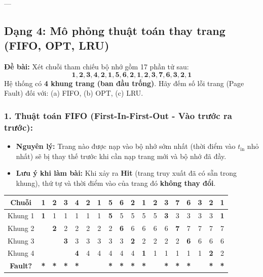 \documentclass[11pt,a4paper]{article}
\begin{document}
---

\subsection{Dạng 4: Mô phỏng thuật toán thay trang (FIFO, OPT, LRU)}

\begin{examplebox}
\textbf{Đề bài:} Xét chuỗi tham chiếu bộ nhớ gồm 17 phần tử sau:
$$\mathbf{1, 2, 3, 4, 2, 1, 5, 6, 2, 1, 2, 3, 7, 6, 3, 2, 1}$$
Hệ thống có \textbf{4 khung trang (ban đầu trống)}. Hãy đếm số lỗi trang (Page Fault) đối với: (a) FIFO, (b) OPT, (c) LRU.
\end{examplebox}

\subsubsection*{1. Thuật toán FIFO (First-In-First-Out - Vào trước ra trước):}
\begin{itemize}[noitemsep]
    \item \textbf{Nguyên lý:} Trang nào được nạp vào bộ nhớ sớm nhất (thời điểm vào $t_{\text{in}}$ nhỏ nhất) sẽ bị thay thế trước khi cần nạp trang mới và bộ nhớ đã đầy.
    \item \textbf{Lưu ý khi làm bài:} Khi xảy ra \textbf{Hit} (trang truy xuất đã có sẵn trong khung), thứ tự và thời điểm vào của trang đó \textbf{không thay đổi}.
\end{itemize}

\begin{table}[h!]
\centering
\scriptsize
\begin{tabular}{|c|c|c|c|c|c|c|c|c|c|c|c|c|c|c|c|c|c|}
\hline
\textbf{Chuỗi} & \textbf{1} & \textbf{2} & \textbf{3} & \textbf{4} & \textbf{2} & \textbf{1} & \textbf{5} & \textbf{6} & \textbf{2} & \textbf{1} & \textbf{2} & \textbf{3} & \textbf{7} & \textbf{6} & \textbf{3} & \textbf{2} & \textbf{1} \\ \hline
Khung 1 & \textbf{1} & 1 & 1 & 1 & 1 & 1 & \textbf{5} & 5 & 5 & 5 & 5 & \textbf{3} & 3 & 3 & 3 & 3 & \textbf{1} \\ \hline
Khung 2 &   & \textbf{2} & 2 & 2 & 2 & 2 & 2 & \textbf{6} & 6 & 6 & 6 & 6 & \textbf{7} & 7 & 7 & 7 & 7 \\ \hline
Khung 3 &   &   & \textbf{3} & 3 & 3 & 3 & 3 & 3 & \textbf{2} & 2 & 2 & 2 & 2 & \textbf{6} & 6 & 6 & 6 \\ \hline
Khung 4 &   &   &   & \textbf{4} & 4 & 4 & 4 & 4 & 4 & \textbf{1} & 1 & 1 & 1 & 1 & 1 & \textbf{2} & 2 \\ \hline
\textbf{Fault?} & \textbf{*} & \textbf{*} & \textbf{*} & \textbf{*} & & & \textbf{*} & \textbf{*} & \textbf{*} & \textbf{*} & & \textbf{*} & \textbf{*} & \textbf{*} & & \textbf{*} & \textbf{*} \\ \hline
\end{tabular}
\end{table}
\end{document}
